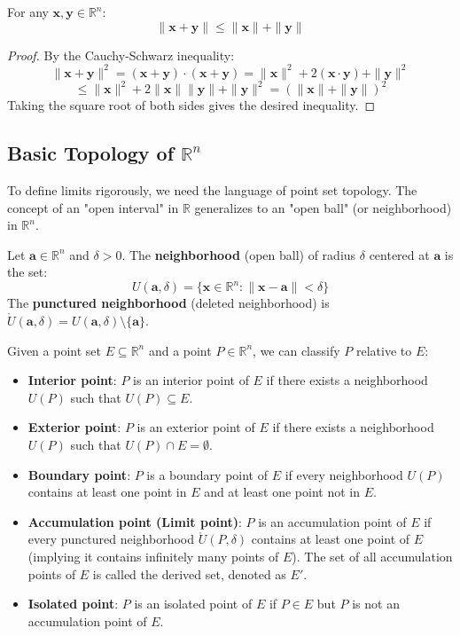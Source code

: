 \begin{theorem}
For any $\mathbf{x}, \mathbf{y} \in \mathbb{R}^n$:
\[ \|\mathbf{x} + \mathbf{y}\| \le \|\mathbf{x}\| + \|\mathbf{y}\| \]
\end{theorem}

\begin{proof}
By the Cauchy-Schwarz inequality:
\[ \|\mathbf{x} + \mathbf{y}\|^2 = (\mathbf{x} + \mathbf{y}) \cdot (\mathbf{x} + \mathbf{y}) = \|\mathbf{x}\|^2 + 2(\mathbf{x} \cdot \mathbf{y}) + \|\mathbf{y}\|^2 \]
\[ \le \|\mathbf{x}\|^2 + 2\|\mathbf{x}\| \|\mathbf{y}\| + \|\mathbf{y}\|^2 = (\|\mathbf{x}\| + \|\mathbf{y}\|)^2 \]
Taking the square root of both sides gives the desired inequality.
\end{proof}

\subsection{Basic Topology of $\mathbb{R}^n$}

To define limits rigorously, we need the language of point set topology. The concept of an "open interval" in $\mathbb{R}$ generalizes to an "open ball" (or neighborhood) in $\mathbb{R}^n$.

\begin{definition}
Let $\mathbf{a} \in \mathbb{R}^n$ and $\delta > 0$. The \textbf{neighborhood} (open ball) of radius $\delta$ centered at $\mathbf{a}$ is the set:
\[ U(\mathbf{a}, \delta) = \{ \mathbf{x} \in \mathbb{R}^n : \|\mathbf{x} - \mathbf{a}\| < \delta \} \]
The \textbf{punctured neighborhood} (deleted neighborhood) is $\mathring{U}(\mathbf{a}, \delta) = U(\mathbf{a}, \delta) \setminus \{\mathbf{a}\}$.
\end{definition}

Given a point set $E \subseteq \mathbb{R}^n$ and a point $P \in \mathbb{R}^n$, we can classify $P$ relative to $E$:
\begin{itemize}
    \item \textbf{Interior point}: $P$ is an interior point of $E$ if there exists a neighborhood $U(P)$ such that $U(P) \subseteq E$.
    \item \textbf{Exterior point}: $P$ is an exterior point of $E$ if there exists a neighborhood $U(P)$ such that $U(P) \cap E = \emptyset$.
    \item \textbf{Boundary point}: $P$ is a boundary point of $E$ if every neighborhood $U(P)$ contains at least one point in $E$ and at least one point not in $E$.
    \item \textbf{Accumulation point (Limit point)}: $P$ is an accumulation point of $E$ if every punctured neighborhood $\mathring{U}(P, \delta)$ contains at least one point of $E$ (implying it contains infinitely many points of $E$). The set of all accumulation points of $E$ is called the derived set, denoted as $E'$.
    \item \textbf{Isolated point}: $P$ is an isolated point of $E$ if $P \in E$ but $P$ is not an accumulation point of $E$.
\end{itemize}

